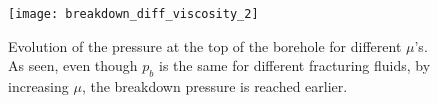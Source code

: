 
\begin{figure}[htbp]
    \centering
    \texttt{[image: breakdown\_diff\_viscosity\_2]}
         \caption{Evolution of the pressure at the top of the borehole for different $\mu$'s. As seen, even though $p_b$ is the same for different fracturing fluids, by increasing $\mu$, the breakdown pressure is reached earlier.}
    \label{Fig:Gas_Pressure_viscosity}
\end{figure}